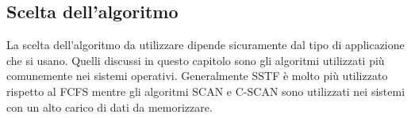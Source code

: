 % 
\subsection{Scelta dell'algoritmo}
La scelta dell'algoritmo da utilizzare dipende sicuramente dal tipo di applicazione che si usano. Quelli discussi in questo capitolo sono gli algoritmi utilizzati più comunemente nei sistemi operativi. Generalmente SSTF è molto più utilizzato rispetto al FCFS mentre gli algoritmi SCAN e C-SCAN sono utilizzati nei sistemi con un alto carico di dati da memorizzare. 






